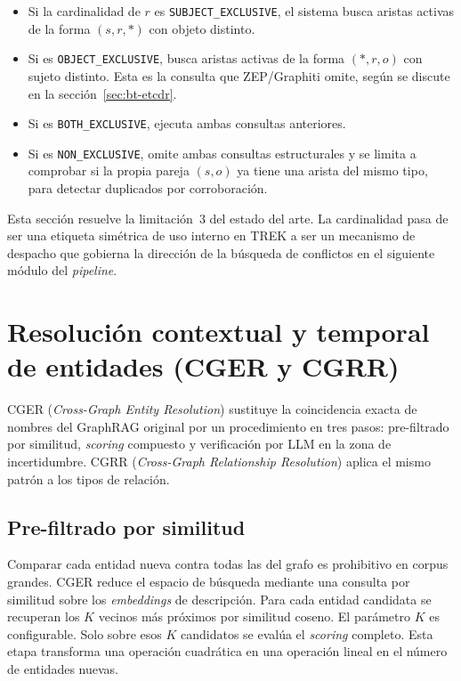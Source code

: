 \begin{itemize}
    \item Si la cardinalidad de $r$ es \texttt{SUBJECT\_EXCLUSIVE}, el sistema busca aristas activas de la forma $(s, r, *)$ con objeto distinto.
    \item Si es \texttt{OBJECT\_EXCLUSIVE}, busca aristas activas de la forma $(*, r, o)$ con sujeto distinto. Esta es la consulta que ZEP/Graphiti omite, según se discute en la sección~\ref{sec:bt-etcdr}.
    \item Si es \texttt{BOTH\_EXCLUSIVE}, ejecuta ambas consultas anteriores.
    \item Si es \texttt{NON\_EXCLUSIVE}, omite ambas consultas estructurales y se limita a comprobar si la propia pareja $(s, o)$ ya tiene una arista del mismo tipo, para detectar duplicados por corroboración.
\end{itemize}

Esta sección resuelve la limitación~3 del estado del arte. La cardinalidad pasa de ser una etiqueta simétrica de uso interno en TREK a ser un mecanismo de despacho que gobierna la dirección de la búsqueda de conflictos en el siguiente módulo del \emph{pipeline}.

\section{Resolución contextual y temporal de entidades (CGER y CGRR)}\label{sec:bt-cger}

CGER (\emph{Cross-Graph Entity Resolution}) sustituye la coincidencia exacta de nombres del GraphRAG original por un procedimiento en tres pasos: pre-filtrado por similitud, \emph{scoring} compuesto y verificación por LLM en la zona de incertidumbre. CGRR (\emph{Cross-Graph Relationship Resolution}) aplica el mismo patrón a los tipos de relación.

\subsection{Pre-filtrado por similitud}

Comparar cada entidad nueva contra todas las del grafo es prohibitivo en corpus grandes. CGER reduce el espacio de búsqueda mediante una consulta por similitud sobre los \emph{embeddings} de descripción. Para cada entidad candidata se recuperan los $K$ vecinos más próximos por similitud coseno. El parámetro $K$ es configurable. Solo sobre esos $K$ candidatos se evalúa el \emph{scoring} completo. Esta etapa transforma una operación cuadrática en una operación lineal en el número de entidades nuevas.

